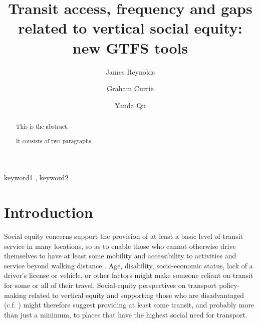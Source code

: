 \documentclass[preprint, 3p,
authoryear]{elsarticle} %
\begin{document}
\begin{frontmatter}

  \title{Transit access, frequency and gaps related to vertical social
equity: new GTFS tools}
    \author[Public Transport Research Group (PTRG)]{James Reynolds%
  }
    \author[Public Transport Research Group (PTRG)]{Graham Currie%
  }
    \author[Public Transport Research Group (PTRG)]{Yanda Qu%
  }
  
  \begin{abstract}
  This is the abstract.

  It consists of two paragraphs.
  \end{abstract}
    \begin{keyword}
    keyword1 \sep 
    keyword2
  \end{keyword}
  
 \end{frontmatter}

\section{Introduction}\label{introduction}

Social equity concerns support the provision of at least a basic level
of transit service in many locations, so as to enable those who cannot
otherwise drive themselves to have at least some mobility and
accessibility to activities and service beyond walking distance
\citep{Currie:2016aa}. Age, disability, socio-economic status, lack of a
driver's license or vehicle, or other factors might make someone reliant
on transit for some or all of their travel. Social-equity perspectives
on transport policy-making related to vertical equity and supporting
those who are disadvantaged (c.f. \citet{Litman:2016aa}) might therefore
suggest providing at least some transit, and probably more than just a
minimum, to places that have the highest social need for transport.
\end{document}
